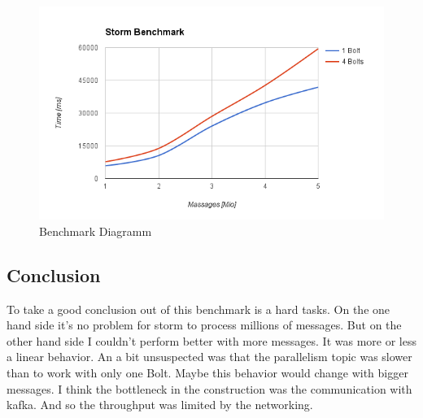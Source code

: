 \begin{figure}[H]
\centering
\captionsetup{justification=centering}
\includegraphics[width=1.0\textwidth]{images/benchmark.png}
\caption[Benchmark Diagramm]{Benchmark Diagramm}
\end{figure}

\subsection{Conclusion}
To take a good conclusion out of this benchmark is a hard tasks.
On the one hand side it's no problem for storm to process millions of messages.
But on the other hand side I couldn't perform better with more messages. It was more or less a linear behavior.
An a bit unsuspected was that the parallelism topic was slower than to work with only one Bolt.
Maybe this behavior would change with bigger messages.
I think the bottleneck in the construction was the communication with kafka. And so the throughput was limited by the networking.





